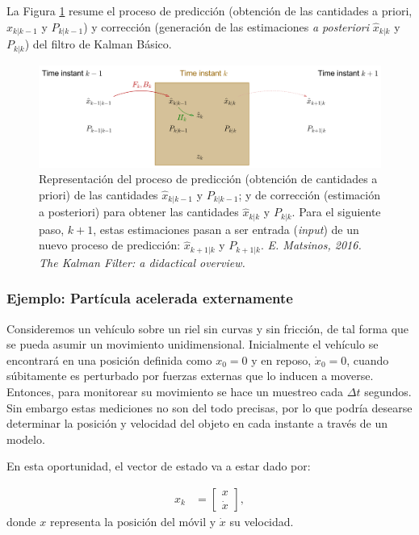 La Figura \ref{fig:kfb} resume el proceso de predicci\'on (obtenci\'on de las cantidades a priori, $\hat{x}_{k|k-1}$ y $P_{k|k-1}$) y correcci\'on (generaci\'on de las estimaciones \textit{a posteriori}  $\hat{x}_{k|k}$ y $P_{k|k}$) del filtro de Kalman B\'asico. 

\begin{figure}[h!]
\centering
\includegraphics[scale=0.5]{images/kfb}
\caption{Representaci\'on del proceso de predicci\'on (obtenci\'on de cantidades a priori) de las cantidades $\hat{x}_{k|k-1}$ y $P_{k|k-1}$;  y de correcci\'on (estimaci\'on a posteriori) para obtener las cantidades $\hat{x}_{k|k}$ y $P_{k|k}$. Para el siguiente paso, $k+1$, estas estimaciones pasan a ser entrada (\textit{input}) de un nuevo proceso de predicci\'on: $\hat{x}_{k+1|k}$ y $P_{k+1|k}$. \textit{E. Matsinos, 2016. The Kalman Filter: a didactical overview.}}
\label{fig:kfb}
\end{figure}
\subsubsection{Ejemplo: Part\'icula acelerada externamente}
Consideremos un veh\'iculo sobre un riel sin curvas y sin fricci\'on, de tal forma que se pueda asumir un movimiento unidimensional. Inicialmente el veh\'iculo se encontrar\'a en una posici\'on definida como $x_0=0$ y en reposo, $\dot{x}_0=0$, cuando s\'ubitamente es perturbado por fuerzas externas que lo inducen a moverse. Entonces, para monitorear su movimiento se hace un muestreo cada $\Delta t$ segundos. Sin embargo estas mediciones no son del todo precisas, por lo que podr\'ia desearse determinar la posici\'on y velocidad del objeto en cada instante a trav\'es de un modelo.
\bigskip

En esta oportunidad, el vector de estado va a estar dado por:

\begin{align}
x_k &= \begin{bmatrix}
x\\ \dot{x}
\end{bmatrix},
\label{eq:example_state} 
\end{align} 
donde $x$ representa la posici\'on del m\'ovil y $\dot{x}$ su velocidad.
\bigskip

